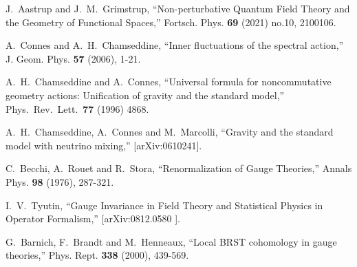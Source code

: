 \documentclass[letterpaper,12pt]{article}
\begin{document}
\begin{thebibliography}{99}
J.~Aastrup and J.~M.~Grimstrup,
``Non-perturbative Quantum Field Theory and the Geometry of Functional Spaces,''
Fortsch. Phys. \textbf{69} (2021) no.10, 2100106.









A.~Connes and A.~H.~Chamseddine,
``Inner fluctuations of the spectral action,''
J. Geom. Phys. \textbf{57} (2006), 1-21.




A.~H.~Chamseddine and A.~Connes,
``Universal formula for noncommutative geometry actions: Unification of
gravity and the standard model,''
Phys.\ Rev.\ Lett.\  {\bf 77} (1996) 4868.








  A.~H.~Chamseddine, A.~Connes and M.~Marcolli,
  ``Gravity and the standard model with neutrino mixing,''
  [arXiv:0610241].





C.~Becchi, A.~Rouet and R.~Stora,
``Renormalization of Gauge Theories,''
Annals Phys. \textbf{98} (1976), 287-321.




I.~V.~Tyutin,
``Gauge Invariance in Field Theory and Statistical Physics in Operator Formalism,''
[arXiv:0812.0580 ].

G.~Barnich, F.~Brandt and M.~Henneaux,
``Local BRST cohomology in gauge theories,''
Phys. Rept. \textbf{338} (2000), 439-569.


\end{thebibliography}
\end{document}

